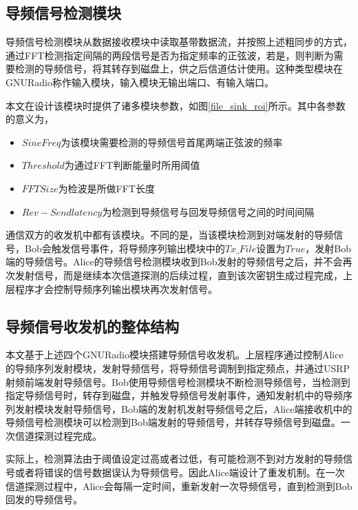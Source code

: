 \subsection{导频信号检测模块}

导频信号检测模块从数据接收模块中读取基带数据流，并按照上述粗同步的方式，通过FFT检测指定间隔的两段信号是否为指定频率的正弦波，若是，则判断为需要检测的导频信号，将其转存到磁盘上，供之后信道估计使用。这种类型模块在GNURadio称作输入模块，输入模块无输出端口、有输入端口。

本文在设计该模块时提供了诸多模块参数，如图\ref{file_sink_roi}所示。其中各参数的意义为，

\begin{itemize}
    \item $Sine Freq$为该模块需要检测的导频信号首尾两端正弦波的频率
    \item $Threshold$为通过FFT判断能量时所用阈值
    \item $FFT Size$为检波是所做FFT长度
    \item $Rev-Send latency$为检测到导频信号与回发导频信号之间的时间间隔
\end{itemize}

通信双方的收发机中都有该模块。不同的是，当该模块检测到对端发射的导频信号，Bob会触发信号事件，将导频序列输出模块中的$Tx\_File$设置为$True$，发射Bob端的导频信号。Alice的导频信号检测模块收到Bob发射的导频信号之后，并不会再次发射信号，而是继续本次信道探测的后续过程，直到该次密钥生成过程完成，上层程序才会控制导频序列输出模块再次发射信号。


\subsection{导频信号收发机的整体结构}

本文基于上述四个GNURadio模块搭建导频信号收发机。上层程序通过控制Alice的导频序列发射模块，发射导频信号，将导频信号调制到指定频点，并通过USRP射频前端发射导频信号。Bob使用导频信号检测模块不断检测导频信号，当检测到指定导频信号时，转存到磁盘，并触发导频信号发射事件，通知发射机中的导频序列发射模块发射导频信号，Bob端的发射机发射导频信号之后，Alice端接收机中的导频信号检测模块可以检测到Bob端发射的导频信号，并转存导频信号到磁盘。一次信道探测过程完成。

实际上，检测算法由于阈值设定过高或者过低，有可能检测不到对方发射的导频信号或者将错误的信号数据误认为导频信号。因此Alice端设计了重发机制。在一次信道探测过程中，Alice会每隔一定时间，重新发射一次导频信号，直到检测到Bob回发的导频信号。

